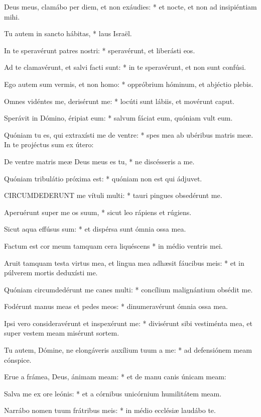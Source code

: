 Deus meus, clamábo per diem, et non exáudies: * et nocte, et non ad insipiéntiam mihi.

Tu autem in sancto hábitas, * laus Israël.

In te speravérunt patres nostri: * speravérunt, et liberásti eos.

Ad te clamavérunt, et salvi facti sunt: * in te speravérunt, et non sunt confúsi.

Ego autem sum vermis, et non homo: * oppróbrium hóminum, et abjéctio plebis.

Omnes vidéntes me, derisérunt me: * locúti sunt lábiis, et movérunt caput.

Sperávit in Dómino, éripiat eum: * salvum fáciat eum, quóniam vult eum.

Quóniam tu es, qui extraxísti me de ventre: * spes mea ab ubéribus matris meæ. In te projéctus sum ex útero:

De ventre matris meæ Deus meus es tu, * ne discésseris a me.

Quóniam tribulátio próxima est: * quóniam non est qui ádjuvet.


\lettrine[lines=2]{C}{IRCUMDEDERUNT} me vítuli multi: * tauri pingues obsedérunt me.

Aperuérunt super me os suum, * sicut leo rápiens et rúgiens.

Sicut aqua effúsus sum: * et dispérsa sunt ómnia ossa mea.

Factum est cor meum tamquam cera liquéscens * in médio ventris mei.

Aruit tamquam testa virtus mea, et lingua mea adhæsit fáucibus meis: * et in púlverem mortis deduxísti me.

Quóniam circumdedérunt me canes multi: * concílium malignántium obsédit me.

Fodérunt manus meas et pedes meos: * dinumeravérunt ómnia ossa mea.

Ipsi vero consideravérunt et inspexérunt me: * divisérunt sibi vestiménta mea, et super vestem meam misérunt sortem.

Tu autem, Dómine, ne elongáveris auxílium tuum a me: * ad defensiónem meam cónspice.

Erue a frámea, Deus, ánimam meam: * et de manu canis únicam meam:

Salva me ex ore leónis: * et a córnibus unicórnium humilitátem meam.

Narrábo nomen tuum frátribus meis: * in médio ecclésiæ laudábo te.

